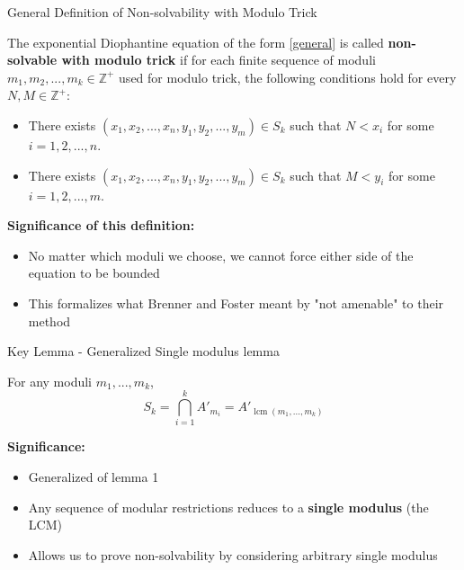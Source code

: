 \begin{frame}{General Definition of Non-solvability with Modulo Trick}
    \begin{definition}
        The exponential Diophantine equation of the form \eqref{general} is called \textbf{non-solvable with modulo trick} if for each finite sequence of moduli $m_1, m_2, ..., m_k \in \mathbb{Z}^{+}$ used for modulo trick, the following conditions hold for every $N, M \in \mathbb{Z}^{+}$:

        \begin{itemize}
            \item There exists $(x_1, x_2, ..., x_n, y_1, y_2, ..., y_m) \in S_k$ such that $N < x_i$ for some $i = 1,2,...,n$.

            \item There exists $(x_1, x_2, ..., x_n, y_1, y_2, ..., y_m) \in S_k$ such that $M < y_i$ for some $i = 1,2,...,m$.
        \end{itemize}
    \end{definition}

    \textbf{Significance of this definition:}
    \begin{itemize}
        \item No matter which moduli we choose, we cannot force either side of the equation to be bounded
        \item This formalizes what Brenner and Foster meant by "not amenable" to their method
    \end{itemize}
\end{frame}

\begin{frame}{Key Lemma - Generalized Single modulus lemma}
    \begin{lemmas}
        For any moduli $m_1,...,m_k$,
        \[S_k = \bigcap_{i=1}^k A'_{m_i} = A'_{\operatorname{lcm}(m_1,...,m_k)}\]
    \end{lemmas}

    \textbf{Significance:}
    \begin{itemize}
        \item Generalized of lemma 1
        \item Any sequence of modular restrictions reduces to a \textbf{single modulus} (the LCM)
        \item Allows us to prove non-solvability by considering arbitrary single modulus
    \end{itemize}
\end{frame}

